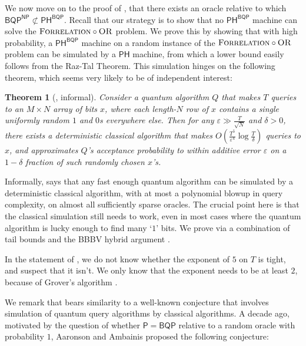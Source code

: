 \documentclass[10pt,a4paper]{article}
\newtheorem{theorem}{Theorem}
\newcommand{\eps}{\varepsilon}
\newcommand{\OR}{\normalfont\textsc{OR}}
\newcommand{\Forrelation}{\normalfont\textsc{Forrelation}}
\begin{document}
\bigskip

We now move on to the proof of , that there exists an oracle relative to which $\mathsf{BQP}^\mathsf{NP} \not\subset \mathsf{PH}^\mathsf{BQP}$. Recall that our strategy is to show that no $\mathsf{PH}^\mathsf{BQP}$ machine can solve the $\Forrelation \circ \OR$ problem. We prove this by showing that with high probability, a $\mathsf{PH}^\mathsf{BQP}$ machine on a random instance of the $\Forrelation \circ \OR$ problem can be simulated by a $\mathsf{PH}$ machine, from which a lower bound easily follows from the Raz-Tal Theorem. This simulation hinges on the following theorem, which seems very likely to be of independent interest:

\begin{theorem}[, informal]
\label{thm:sparse_aa_intro}
Consider a quantum algorithm $Q$ that makes $T$ queries to an $M \times N$ array of bits $x$, where each length-$N$ row of $x$ contains a single uniformly random $1$ and $0$s everywhere else. Then for any $\eps \gg \frac{T}{\sqrt{N}}$ and $\delta > 0$, there exists a deterministic classical algorithm that makes $O\left(\frac{T^5}{\eps^4} \log \frac{T}{\delta}\right)$ queries to $x$, and approximates $Q$'s acceptance probability to within additive error $\eps$ on a $1 - \delta$ fraction of such randomly chosen $x$'s.
\end{theorem}

Informally,  says that any fast enough quantum algorithm can be simulated by a deterministic classical algorithm, with at most a polynomial blowup in query complexity, on almost all sufficiently sparse oracles. The crucial point here is that the classical simulation still needs to work, even in most cases where the quantum algorithm is lucky enough to find many `$1$' bits.  We prove  via a combination of tail bounds and the BBBV hybrid argument \cite{BBBV97}.

In the statement of , we do not know whether the exponent of $5$ on $T$ is tight, and suspect that it isn't.  We only know that the exponent needs to be at least $2$, because of Grover's algorithm \cite{Gro96}.

We remark that  bears similarity to a well-known conjecture that involves simulation of quantum query algorithms by classical algorithms. A decade ago, motivated by the question of whether $\mathsf{P}=\mathsf{BQP}$ relative to a random oracle with probability $1$, Aaronson and Ambainis \cite{AA14} proposed the following conjecture:
\end{document}
